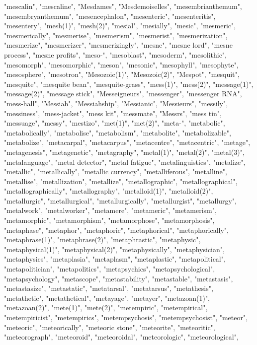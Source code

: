 "mescalin",
"mescaline",
"Mesdames",
"Mesdemoiselles",
"mesembrianthemum",
"mesembryanthemum",
"mesencephalon",
"mesenteric",
"mesenteritis",
"mesentery",
"mesh(1)",
"mesh(2)",
"mesial",
"mesially",
"mesic",
"mesmeric",
"mesmerically",
"mesmerise",
"mesmerism",
"mesmerist",
"mesmerization",
"mesmerize",
"mesmerizer",
"mesmerizingly",
"mesne",
"mesne lord",
"mesne process",
"mesne profits",
"meso-",
"mesoblast",
"mesoderm",
"mesolithic",
"mesomorph",
"mesomorphic",
"meson",
"mesonic",
"mesophyll",
"mesophyte",
"mesosphere",
"mesotron",
"Mesozoic(1)",
"Mesozoic(2)",
"Mespot",
"mesquit",
"mesquite",
"mesquite bean",
"mesquite-grass",
"mess(1)",
"mess(2)",
"message(1)",
"message(2)",
"message stick",
"Messeigneurs",
"messenger",
"messenger RNA",
"mess-hall",
"Messiah",
"Messiahship",
"Messianic",
"Messieurs",
"messily",
"messiness",
"mess-jacket",
"mess kit",
"messmate",
"Messrs",
"mess tin",
"messuage",
"messy",
"mestizo",
"met(1)",
"met(2)",
"meta-",
"metabolic",
"metabolically",
"metabolise",
"metabolism",
"metabolite",
"metabolizable",
"metabolize",
"metacarpal",
"metacarpus",
"metacentre",
"metacentric",
"metage",
"metagenesis",
"metagenetic",
"metagraphy",
"metal(1)",
"metal(2)",
"metal(3)",
"metalanguage",
"metal detector",
"metal fatigue",
"metalinguistics",
"metalize",
"metallic",
"metallically",
"metallic currency",
"metalliferous",
"metalline",
"metallise",
"metallization",
"metallize",
"metallographic",
"metallographical",
"metallographically",
"metallography",
"metalloid(1)",
"metalloid(2)",
"metallurgic",
"metallurgical",
"metallurgically",
"metallurgist",
"metallurgy",
"metalwork",
"metalworker",
"metamere",
"metameric",
"metamerism",
"metamorphic",
"metamorphism",
"metamorphose",
"metamorphosis",
"metaphase",
"metaphor",
"metaphoric",
"metaphorical",
"metaphorically",
"metaphrase(1)",
"metaphrase(2)",
"metaphrastic",
"metaphysic",
"metaphysical(1)",
"metaphysical(2)",
"metaphysically",
"metaphysician",
"metaphysics",
"metaplasia",
"metaplasm",
"metaplastic",
"metapolitical",
"metapolitician",
"metapolitics",
"metapsychics",
"metapsychological",
"metapsychology",
"metascope",
"metastability",
"metastable",
"metastasis",
"metastasize",
"metastatic",
"metatarsal",
"metatarsus",
"metathesis",
"metathetic",
"metathetical",
"metayage",
"metayer",
"metazoan(1)",
"metazoan(2)",
"mete(1)",
"mete(2)",
"metempiric",
"metempirical",
"metempiricist",
"metempirics",
"metempsychosis",
"metempsychosist",
"meteor",
"meteoric",
"meteorically",
"meteoric stone",
"meteorite",
"meteoritic",
"meteorograph",
"meteoroid",
"meteoroidal",
"meteorologic",
"meteorological",

